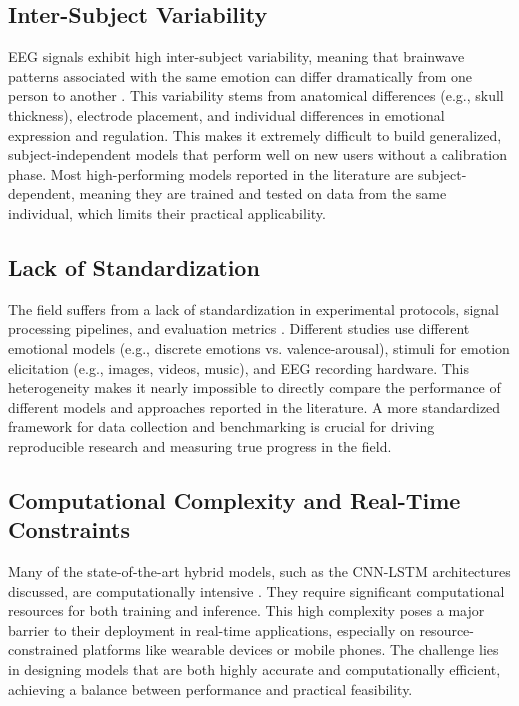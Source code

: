 \documentclass[conference]{IEEEtran}
\begin{document}
\subsection*{Inter-Subject Variability}
EEG signals exhibit high inter-subject variability, meaning that brainwave patterns associated with the same emotion can differ dramatically from one person to another \cite{b7}. This variability stems from anatomical differences (e.g., skull thickness), electrode placement, and individual differences in emotional expression and regulation. This makes it extremely difficult to build generalized, subject-independent models that perform well on new users without a calibration phase. Most high-performing models reported in the literature are subject-dependent, meaning they are trained and tested on data from the same individual, which limits their practical applicability.

\subsection*{Lack of Standardization}
The field suffers from a lack of standardization in experimental protocols, signal processing pipelines, and evaluation metrics \cite{b6}. Different studies use different emotional models (e.g., discrete emotions vs. valence-arousal), stimuli for emotion elicitation (e.g., images, videos, music), and EEG recording hardware. This heterogeneity makes it nearly impossible to directly compare the performance of different models and approaches reported in the literature. A more standardized framework for data collection and benchmarking is crucial for driving reproducible research and measuring true progress in the field.

\subsection*{Computational Complexity and Real-Time Constraints}
Many of the state-of-the-art hybrid models, such as the CNN-LSTM architectures discussed, are computationally intensive \cite{b2}. They require significant computational resources for both training and inference. This high complexity poses a major barrier to their deployment in real-time applications, especially on resource-constrained platforms like wearable devices or mobile phones. The challenge lies in designing models that are both highly accurate and computationally efficient, achieving a balance between performance and practical feasibility.
\end{document}
